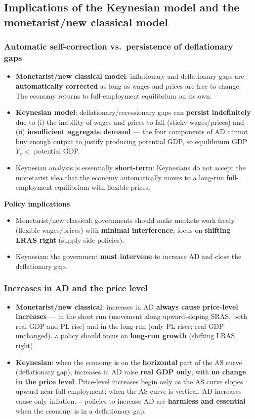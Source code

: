 \documentclass[a4paper,12pt]{article}
\begin{document}
\subsection{Implications of the Keynesian model and the monetarist/new classical model}
\subsubsection*{Automatic self-correction vs.\ persistence of deflationary gaps}
\begin{itemize}
  \item \textbf{Monetarist/new classical model}: inflationary and deflationary gaps are \textbf{automatically corrected} as long as wages and prices are free to change. The economy returns to full-employment equilibrium on its own.
  \item \textbf{Keynesian model}: deflationary/recessionary gaps can \textbf{persist indefinitely} due to (i) the inability of wages and prices to fall (sticky wages/prices) and (ii) \textbf{insufficient aggregate demand} --- the four components of AD cannot buy enough output to justify producing potential GDP, so equilibrium GDP $Y_e <$ potential GDP.
  \item Keynesian analysis is essentially \textbf{short-term}: Keynesians do not accept the monetarist idea that the economy automatically moves to a long-run full-employment equilibrium with flexible prices.
\end{itemize}
\textbf{Policy implications}:
\begin{itemize}
  \item Monetarist/new classical: governments should make markets work freely (flexible wages/prices) with \textbf{minimal interference}; focus on \textbf{shifting LRAS right} (supply-side policies).
  \item Keynesian: the government \textbf{must intervene} to increase AD and close the deflationary gap.
\end{itemize}
\subsubsection*{Increases in AD and the price level}
\begin{itemize}
  \item \textbf{Monetarist/new classical}: increases in AD \textbf{always cause price-level increases} --- in the short run (movement along upward-sloping SRAS, both real GDP and PL rise) and in the long run (only PL rises; real GDP unchanged). $\therefore$ policy should focus on \textbf{long-run growth} (shifting LRAS right).
  \item \textbf{Keynesian}: when the economy is on the \textbf{horizontal} part of the AS curve (deflationary gap), increases in AD raise \textbf{real GDP only}, with \textbf{no change in the price level}. Price-level increases begin only as the AS curve slopes upward near full employment; when the AS curve is vertical, AD increases cause only inflation. $\therefore$ policies to increase AD are \textbf{harmless and essential} when the economy is in a deflationary gap.
\end{itemize}
\end{document}

